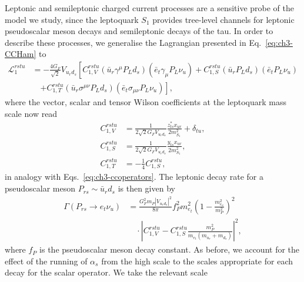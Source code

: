 Leptonic and semileptonic charged current processes are a sensitive probe of the
model we study, since the leptoquark $S_{1}$ provides tree-level channels for
leptonic pseudoscalar meson decays and semileptonic decays of the tau. In order
to describe these processes, we generalise the Lagrangian presented in
Eq.~\eqref{eq:ch3-CCHam} to
\begin{equation} \label{eq:ch3-CCHam2}
  \begin{split}
    \mathscr{L}^{rstu}_{1} &= -\frac{4 G_F}{\sqrt{2}} V_{u_r d_s} \left[
      C_{1,V}^{rstu}(\bar{u}_r \gamma^\mu P_L d_s)(\bar{e}_t \gamma_\mu P_L
      \nu_{u}) + C^{rstu}_{1,S} (\bar{u}_r P_L d_s)(\bar{e}_t P_L\nu_{u}) \right. \\
    &\quad \left. + C^{rstu}_{1,T} (\bar{u}_r \sigma^{\mu \nu} P_L d_s)
      (\bar{e}_t \sigma_{\mu \nu} P_L \nu_{u})\right],
  \end{split}
\end{equation}
where the vector, scalar and tensor Wilson coefficients at the leptoquark mass
scale now read
\begin{subequations} \label{eq:ch3-ccoperators2}
  \begin{align}
    C_{1,V}^{rstu} &= \frac{1}{2 \sqrt{2} G_F V_{u_r d_s}} \frac{z_{ts}^* x_{ur}}{2m_{S_{1}}^2} + \delta_{tu},\\
    C_{1,S}^{rstu} &= \frac{1}{2 \sqrt{2} G_F V_{u_r d_s}} \frac{y_{t s} x_{u r}}{2m_{S_{1}}^2},\\
    C_{1,T}^{rstu} &= -\frac{1}{4} C_{1,S}^{rstu}, \label{eq:ch3-ccops3}
  \end{align}
\end{subequations}
in analogy with Eqs.~\eqref{eq:ch3-ccoperators}. The leptonic decay rate for a
pseudoscalar meson $P_{rs} \sim \bar{u}_r d_s$ is then given
by~\cite{Becirevic:2016oho}
\begin{equation} \label{eq:ch3-plnu}
  \begin{split}
    \Gamma(P_{rs} \to e_t \nu_{u}) &= \frac{G_F^2 m_P |V_{u_r d_s}|^2}{8\pi} f_P^2 m_{e_t}^2 \left( 1 - \frac{m_{e_u}^2}{m_P^2} \right)^2\\ &\quad \cdot \left| C_{1,V}^{rstu} - C_{1,S}^{rstu} \frac{m_P^2}{m_{e_t}(m_{u_r} + m_{d_s})} \right|^2,
  \end{split}
\end{equation}
where $f_P$ is the pseudoscalar meson decay constant. As before, we account for
the effect of the running of $\alpha_s$ from the high scale to the scales
appropriate for each decay for the scalar operator. We take the relevant scale
